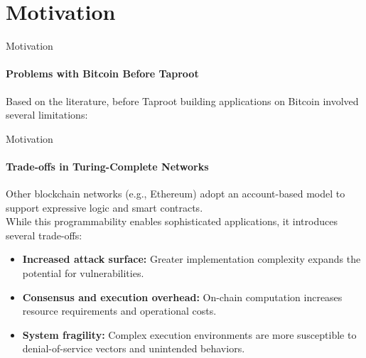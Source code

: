 
\section{Motivation}
\begin{frame}{Motivation}
\framesubtitle{Problems with Bitcoin Before Taproot}

Based on the literature, before Taproot building applications on Bitcoin involved several limitations:

\begin{table}[h]
    \centering
    \caption{Comparison of anchoring methods on Bitcoin}
    \label{tab:comparativeBitcoin}
\end{table}
\end{frame}


\begin{frame}{Motivation}
\framesubtitle{Trade-offs in Turing-Complete Networks}

Other blockchain networks (e.g., Ethereum) adopt an account-based model to support expressive logic and smart contracts.\\
\vspace*{0.2cm}
While this programmability enables sophisticated applications, it introduces several trade-offs:

\begin{itemize}
    \item \textbf{Increased attack surface:} Greater implementation complexity expands the potential for vulnerabilities.
    \item \textbf{Consensus and execution overhead:} On-chain computation increases resource requirements and operational costs.
    \item \textbf{System fragility:} Complex execution environments are more susceptible to denial-of-service vectors and unintended behaviors.
\end{itemize}
\end{frame}

